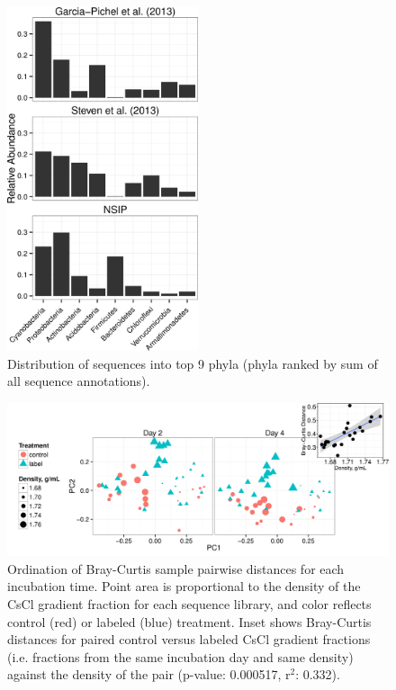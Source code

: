 \begin{figure}[h!]
  \centering
    \includegraphics[width=0.5\textwidth]{figures/study_phylum_dist/study_phylum_dist.png}
  \caption{Distribution of sequences into top 9 phyla (phyla ranked by sum of all sequence annotations).}
  \label{fig:study_phy_dist}
\end{figure}

\begin{figure}[h!]
  \centering
  \includegraphics[width=1.0\textwidth]{figures/ordination_all_day_facet/ordination_day_facet_w_inset.png}
  \caption{Ordination of Bray-Curtis sample pairwise distances for each incubation time. Point area is proportional to the density of the CsCl gradient fraction for each sequence library, and color reflects control (red) or labeled (blue) treatment. Inset shows Bray-Curtis distances for paired control versus labeled CsCl gradient fractions (i.e. fractions from the same incubation day and same density) against the density of the pair (p-value: 0.000517, r$^{2}$: 0.332).}
  \label{fig:ordination}
\end{figure}

